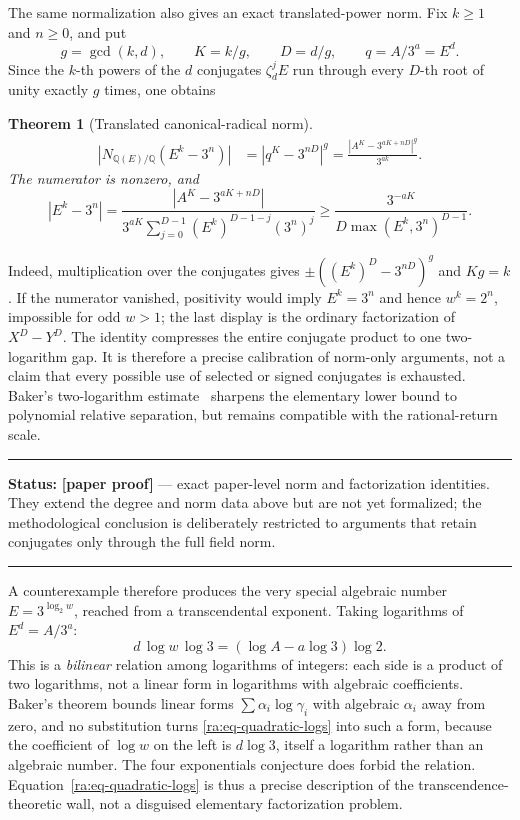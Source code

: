 \documentclass[11pt,oneside]{article}
\newtheorem{theorem}{Theorem}[section]
\theoremstyle{definition}
\theoremstyle{remark}
\newcommand{\Q}{\mathbb Q}
\newcommand{\statusnew}{\textcolor{newgreen}{\textbf{[paper proof]}}}
\newenvironment{statusbox}[1]
{\begin{center}\begin{minipage}{0.94\textwidth}\raggedright\hbadness=10000\hrule
\vspace{0.45em}\textbf{Status:} #1\par\vspace{0.35em}}
{\vspace{0.35em}\hrule\end{minipage}\end{center}}
\begin{document}
The same normalization also gives an exact translated-power norm.  Fix $k\ge1$ and $n\ge0$,
and put
\[
 g=\gcd(k,d),\qquad K=k/g,\qquad D=d/g,
 \qquad q=A/3^a=E^d.
\]
Since the $k$-th powers of the $d$ conjugates $\zeta_d^jE$ run through every $D$-th root
of unity exactly $g$ times, one obtains
\begin{theorem}[Translated canonical-radical norm]
\label{ra:translated-norm}
\begin{align}
 \left|N_{\Q(E)/\Q}(E^k-3^n)\right|
 &=|q^K-3^{nD}|^g
 =\frac{|A^K-3^{aK+nD}|^g}{3^{ak}}.\label{ra:eq-translated-norm}
\end{align}
The numerator is nonzero, and
\begin{equation}
 |E^k-3^n|
 =\frac{|A^K-3^{aK+nD}|}
 {3^{aK}\displaystyle\sum_{j=0}^{D-1}(E^k)^{D-1-j}(3^n)^j}
 \ge\frac{3^{-aK}}{D\max(E^k,3^n)^{D-1}}.
 \label{ra:eq-translated-factor}
\end{equation}
\end{theorem}

Indeed, multiplication over the conjugates gives
$\pm((E^k)^D-3^{nD})^g$ and $Kg=k$.  If the numerator vanished, positivity would imply
$E^k=3^n$ and hence $w^k=2^n$, impossible for odd $w>1$; the last display is the ordinary
factorization of $X^D-Y^D$.  The identity compresses the entire conjugate product to one
two-logarithm gap.  It is therefore a precise calibration of norm-only arguments, not a
claim that every possible use of selected or signed conjugates is exhausted.  Baker's
two-logarithm estimate~\cite{Baker1975} sharpens the elementary lower bound to polynomial relative separation,
but remains compatible with the rational-return scale.

\begin{statusbox}{\statusnew{} --- exact paper-level norm and factorization identities.  They
extend the degree and norm data above but are not yet formalized; the methodological conclusion
is deliberately restricted to arguments that retain conjugates only through the full field
norm.}
\end{statusbox}

A counterexample therefore produces the very special algebraic number $E=3^{\log_2w}$,
reached from a transcendental exponent.  Taking logarithms of $E^d=A/3^a$:
\begin{equation}
d\,\log w\,\log3=(\log A-a\log3)\log2 .
\label{ra:eq-quadratic-logs}
\end{equation}
This is a \emph{bilinear} relation among logarithms of integers: each side is a product of
two logarithms, not a linear form in logarithms with algebraic coefficients.  Baker's
theorem \cite{Baker1975} bounds linear forms $\sum\alpha_i\log\gamma_i$ with algebraic
$\alpha_i$ away from zero, and no substitution turns \eqref{ra:eq-quadratic-logs} into such
a form, because the coefficient of $\log w$ on the left is $d\log3$, itself a logarithm
rather than an algebraic number.  The four exponentials conjecture does forbid the relation.
Equation~\eqref{ra:eq-quadratic-logs} is thus a precise description of the
transcendence-theoretic wall, not a disguised elementary factorization problem.
\end{document}
